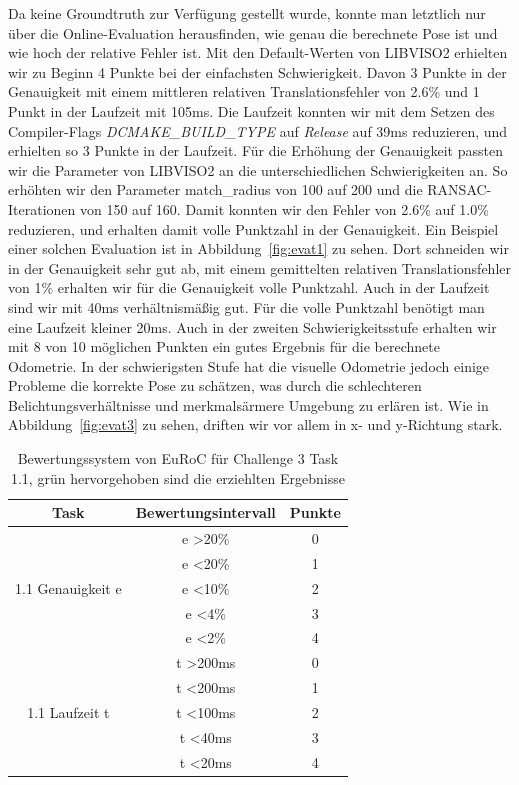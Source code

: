 \documentclass[12pt,titlepage, a4paper]{article}
\begin{document}
Da keine Groundtruth zur Verfügung gestellt wurde, konnte man letztlich nur über die Online-Evaluation herausfinden, wie genau die berechnete Pose ist und wie hoch der relative Fehler ist.
Mit den Default-Werten von \mbox{LIBVISO2} erhielten wir zu Beginn 4 Punkte bei der einfachsten Schwierigkeit. 
Davon 3 Punkte in der Genauigkeit mit einem mittleren relativen Translationsfehler von 2.6\% und 1 Punkt in der Laufzeit mit 105ms.
Die Laufzeit konnten wir mit dem Setzen des Compiler-Flags \textit{DCMAKE\_BUILD\_TYPE} auf \textit{Release} auf 39ms reduzieren, und erhielten so 3 Punkte in der Laufzeit.
Für die Erhöhung der Genauigkeit passten wir die Parameter von \mbox{LIBVISO2} an die unterschiedlichen Schwierigkeiten an. 
So erhöhten wir den Parameter match\_radius von 100 auf 200 und die RANSAC-Iterationen von 150 auf 160.
Damit konnten wir den Fehler von 2.6\% auf 1.0\% reduzieren, und erhalten damit volle Punktzahl in der Genauigkeit.
Ein Beispiel einer solchen Evaluation ist in Abbildung~\ref{fig:evat1} zu sehen. Dort schneiden wir in der Genauigkeit sehr gut ab, mit einem gemittelten relativen Translationsfehler 
von 1\% erhalten wir für die Genauigkeit volle Punktzahl. Auch in der Laufzeit sind wir mit 40ms verhältnismäßig gut. Für die volle Punktzahl benötigt man eine Laufzeit kleiner 20ms.
Auch in der zweiten Schwierigkeitsstufe erhalten wir mit 8 von 10 möglichen Punkten ein gutes Ergebnis für die berechnete Odometrie. In der schwierigsten Stufe hat die visuelle Odometrie
jedoch einige Probleme die korrekte Pose zu schätzen, was durch die schlechteren Belichtungsverhältnisse und merkmalsärmere Umgebung zu erlären ist.
Wie in Abbildung~\ref{fig:evat3} zu sehen, driften wir vor allem in x- und y-Richtung stark.


\begin{table}
\centering
\begin{tabular}{c|c|c}
Task & Bewertungsintervall & Punkte\\
\hline
\multirow{5}{*}{1.1 Genauigkeit e} & e \textgreater 20\% & 0 \\
 & e \textless 20\% & 1\\  
  & e \textless 10\% & 2\\
   & e \textless 4\% & 3\\
 &\cellcolor{green!10.0} e \textless 2\% & \cellcolor{green!10.0}4\\
\hline
\multirow{5}{*}{1.1 Laufzeit t} & t \textgreater 200ms & 0 \\
 & t \textless 200ms & 1\\  
  & t \textless 100ms & 2\\
  & \cellcolor{green!10.0}t \textless 40ms &\cellcolor{green!10.0} 3\\
 & t \textless 20ms & 4\\
\hline
\end{tabular}\\
\vspace{10mm}
\caption{Bewertungssystem von EuRoC für Challenge 3 Task 1.1, grün hervorgehoben sind die erziehlten Ergebnisse}
\label{table:scoringt1}
\end{table}
\end{document}
